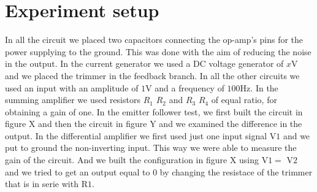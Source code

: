 \documentclass[oneside]{book}
\begin{document}
\section{Experiment setup}
In all the circuit we placed two capacitors connecting the op-amp's pins for the power supplying to the ground. This was done with the aim of reducing the noise in the output.
In the current generator we used a DC voltage generator of $x$V and we placed the trimmer in the feedback branch. In all the other circuits we used an input with an amplitude of $1$V and a frequency of $100$Hz.
In the summing amplifier we used resistors $R_1$ $R_2$ and $R_3$ $R_4$ of equal ratio, for obtaining a gain of one.
In the emitter follower test, we first built the circuit in figure X and then the circuit in figure Y and we examined the difference in the output.
In the differential amplifier we first used just one input signal V$1$ and we put to ground the non-inverting input. This way we were able to measure the gain of the circuit. And we built the configuration in figure X using V$1 =$ V$2$ and we tried to get an output equal to $0$ by changing the resistace of the trimmer that is in serie with R$1$.
\end{document}
